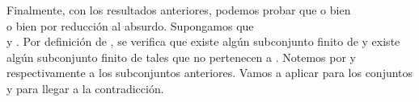 \begin{isabellebody}
\begin{isamarkuptext}
\begin{demostracion}
  Finalmente, con los resultados anteriores, podemos probar que o bien\\  o bien 
   por reducción al absurdo. Supongamos que\\  y . Por
  definición de , se verifica que existe algún subconjunto finito de  y existe algún 
  subconjunto finito de  tales que no pertenecen a . Notemos por  y  
  respectivamente a los subconjuntos anteriores. Vamos a aplicar \isa{{\isasymtwo}{\isacharparenright}} para los conjuntos  
  y  para llegar a la contradicción.


\end{demostracion}
\end{isamarkuptext}
\end{isabellebody}
